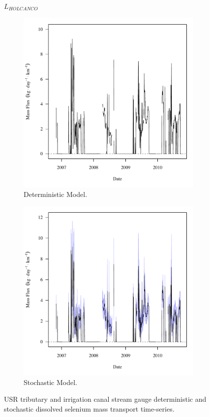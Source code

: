 \subfiguremid
\begin{landscape}
	\begin{figure}
		$ \displaystyle L_{HOLCANCO} $
		\begin{subfigure}{0.7\textwidth}
			\centering
			\includegraphics[width=\tableCustomSize]{"Figures/Results_USR/Deterministic/f HOL"}
			\caption{Deterministic Model.}
		\end{subfigure}%
		\begin{subfigure}{0.7\textwidth}
			\centering
			\includegraphics[width=\tableCustomSize]{"Figures/Results_USR/Stochastic/f HOL"}
			\caption{Stochastic Model.}
		\end{subfigure}
		\caption{USR tributary and irrigation canal stream gauge deterministic and stochastic dissolved selenium mass transport time-series.}
	\end{figure}
\end{landscape}
